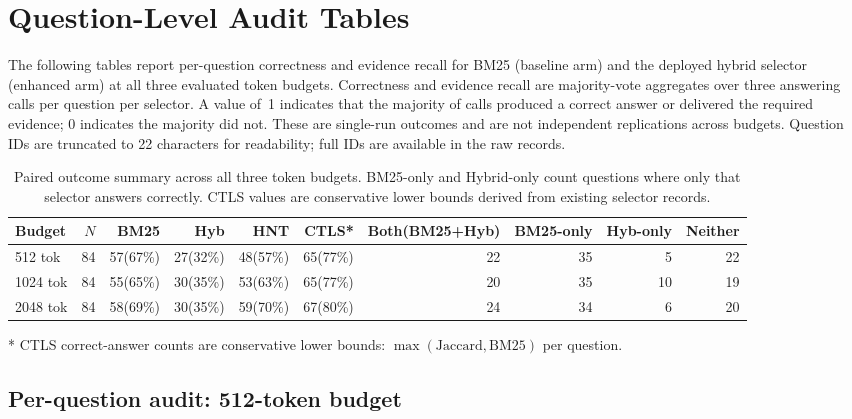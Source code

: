 \clearpage\appendix

\section{Question-Level Audit Tables}
\label{app:audit}

The following tables report per-question correctness and evidence recall for BM25 (baseline arm)
and the deployed hybrid selector (enhanced arm) at all three evaluated token budgets.
Correctness and evidence recall are majority-vote aggregates over three answering calls per question
per selector. A value of~1 indicates that the majority of calls produced a correct answer or
delivered the required evidence; 0 indicates the majority did not. These are single-run outcomes
and are not independent replications across budgets. Question IDs are truncated to 22 characters
for readability; full IDs are available in the raw records.

\begin{table}[htbp]\centering\small
\caption{Paired outcome summary across all three token budgets. BM25-only and Hybrid-only count questions where only that selector answers correctly. CTLS values are conservative lower bounds derived from existing selector records.}
\label{tab:outcome_summary}
\begin{tabular}{lrrrrrrrrr}\toprule
Budget & $N$ & BM25 & Hyb & HNT & CTLS* & Both(BM25+Hyb) & BM25-only & Hyb-only & Neither \\\midrule
512 tok  & 84 & 57(67\%) & 27(32\%) & 48(57\%) & 65(77\%) & 22 & 35 & 5 & 22 \\
1024 tok & 84 & 55(65\%) & 30(35\%) & 53(63\%) & 65(77\%) & 20 & 35 & 10 & 19 \\
2048 tok & 84 & 58(69\%) & 30(35\%) & 59(70\%) & 67(80\%) & 24 & 34 & 6 & 20 \\
\bottomrule\end{tabular}
\par\vspace{2pt}\small{* CTLS correct-answer counts are conservative lower bounds: $\max(\text{Jaccard},\text{BM25})$ per question.}
\end{table}

\FloatBarrier

\subsection{Per-question audit: 512-token budget}

